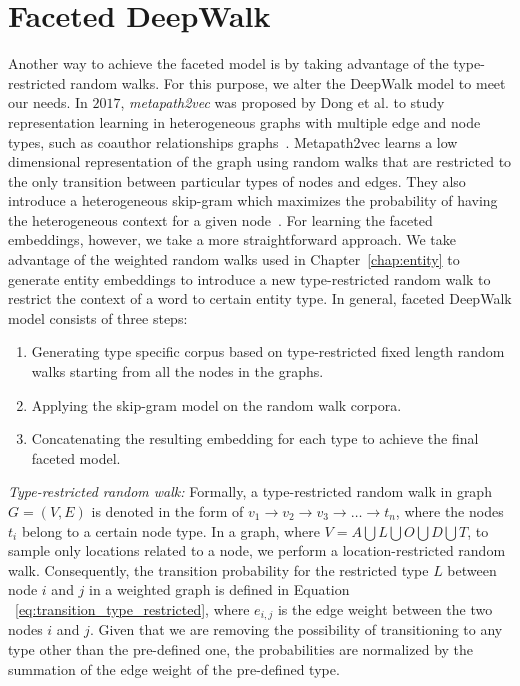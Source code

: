 \section{Faceted DeepWalk}\label{sec:faceted_deepwalk}
Another way to achieve the faceted model is by taking advantage of the type-restricted random walks. For this purpose, we alter the DeepWalk model to meet our needs. In $2017$, \emph{metapath2vec} was proposed by Dong et al. to study representation learning in heterogeneous graphs with multiple edge and node types, such as coauthor relationships graphs~. Metapath2vec learns a low dimensional representation of the graph using random walks that are restricted to the only transition between particular types of nodes and edges. They also introduce a heterogeneous skip-gram which maximizes the probability of having the heterogeneous context for a given node~. For learning the faceted embeddings, however, we take a more straightforward approach. We take advantage of the weighted random walks used in Chapter~\ref{chap:entity} to generate entity embeddings to introduce a new type-restricted random walk to restrict the context of a word to certain entity type. 
In general, faceted DeepWalk model consists of three steps: 
\begin{enumerate}
\item Generating type specific corpus based on type-restricted fixed length random walks starting from all the nodes in the graphs.
\item Applying the skip-gram model on the random walk corpora. 
\item Concatenating the resulting embedding for each type to achieve the final faceted model.  
\end{enumerate}
\emph{Type-restricted random walk:} Formally, a type-restricted random walk in graph $G=(V,E)$ is denoted in the form of $v_1 \rightarrow v_2 \rightarrow v_3\rightarrow \dots \rightarrow t_n$, where the nodes $t_i$ belong to a certain node type. In a graph, where $V=A\bigcup  L\bigcup  O\bigcup  D\bigcup  T$, to sample only locations related to a node, we perform a location-restricted random walk. Consequently, the transition probability for the restricted type $L$ between node $i$ and $j$ in a weighted graph is defined in Equation ~\ref{eq:transition_type_restricted}, where $e_{i,j}$ is the edge weight between the two nodes $i$ and $j$. Given that we are removing the possibility of transitioning to any type other than the pre-defined one, the probabilities are normalized by the summation of the edge weight of the pre-defined type.
